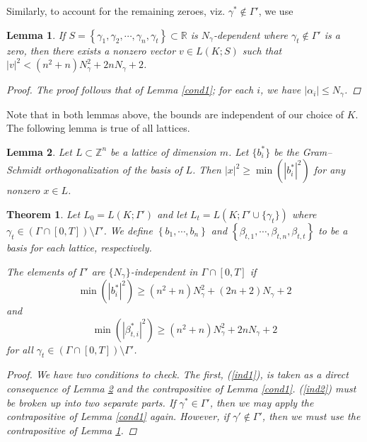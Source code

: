 \documentclass{article}
\newtheorem{Lem}{Lemma}
\newtheorem{theorem}{Theorem}
\numberwithin{equation}{section}
\begin{document}
Similarly, to account for the remaining zeroes, viz. $\gamma^*\notin\Gamma'$, we use

\begin{Lem}\label{cond2}
 If $S = \left\{\gamma_1,\gamma_2, \cdots, \gamma_n,\gamma_t\right\} \subset \mathbb{R}$ is $N_\gamma$-dependent where $\gamma_t \not\in\Gamma'$ is a zero, then there exists a nonzero vector $v\in L(K;S)$ such that $|v|^2 < (n^2+n)N_{\gamma}^2+2nN_{\gamma}+2$.

\begin{proof}
The proof follows that of Lemma \ref{cond1}; for each $i$, we have $|\alpha_{i}| \leq N_\gamma$.
\end{proof}
\end{Lem}

Note that in both lemmas above, the bounds are independent of our choice of $K$. The following lemma is true of all lattices.

\begin{Lem}\cite[Proposition 3.14]{small-vecs}\label{gram}
 Let $L \subset \mathbb{Z}^n$ be a lattice of dimension $m$. Let $\{b_i^*\}$ be the Gram--Schmidt orthogonalization of the basis of $L$. Then $|x|^2 \geq \min\left(|b_i^*|^2\right)$ for any nonzero $x \in L$. 
\end{Lem}

\begin{theorem}\label{cond3}
Let $L_0 = L(K;\Gamma')$ and let $L_t = L(K;\Gamma' \cup \{\gamma_t\})$ where $\gamma_t \in (\Gamma \cap [0,T]) \setminus \Gamma'$. We define $\left\{b_1,\cdots,b_n\right\}$ and $\left\{\beta_{t,1},\cdots,\beta_{t,n},\beta_{t,t}\right\}$ to be a basis for each lattice, respectively.

The elements of $\Gamma'$ are $\{N_{\gamma}\}$-independent in $\Gamma \cap [0, T]$ if 
$$\min\left(|b_i^*|^2\right) \geq (n^2+n)N_{\gamma}^2+(2n+2)N_{\gamma}+2$$
and
$$\min\left(|\beta_{t,i}^*|^2\right) \geq (n^2+n)N_{\gamma}^2+2nN_{\gamma}+2$$
for all $\gamma_t \in (\Gamma \cap [0,T]) \setminus \Gamma'$.

\begin{proof}
 We have two conditions to check. The first, (\ref{ind1}), is taken as a direct consequence of Lemma \ref{gram} and the contrapositive of Lemma \ref{cond1}. (\ref{ind2}) must be broken up into two separate parts. If $\gamma^* \in \Gamma'$, then we may apply the contrapositive of Lemma \ref{cond1} again. However, if $\gamma' \not\in \Gamma'$, then we must use the contrapositive of Lemma \ref{cond2}.
\end{proof}

\end{theorem}
\end{document}
